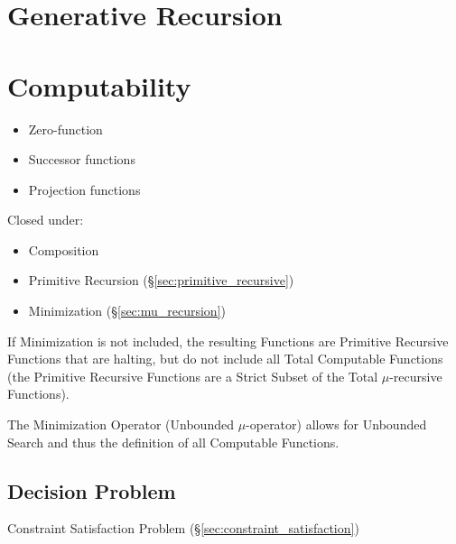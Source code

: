 \section{Generative Recursion}\label{sec:generative_recursion}

\section{Computability}\label{sec:computability}

\begin{itemize}
\item Zero-function
\item Successor functions
\item Projection functions
\end{itemize}

Closed under:

\begin{itemize}
\item Composition
\item Primitive Recursion (\S\ref{sec:primitive_recursive})
\item Minimization (\S\ref{sec:mu_recursion})
\end{itemize}

If Minimization is not included, the resulting Functions are Primitive
Recursive Functions that are halting, but do not include all Total
Computable Functions (the Primitive Recursive Functions are a Strict
Subset of the Total $\mu$-recursive Functions).

The Minimization Operator (Unbounded $\mu$-operator) allows for
Unbounded Search and thus the definition of all Computable Functions.



\subsection{Decision Problem}\label{sec:decision_problem}

\fist Constraint Satisfaction Problem
(\S\ref{sec:constraint_satisfaction})



